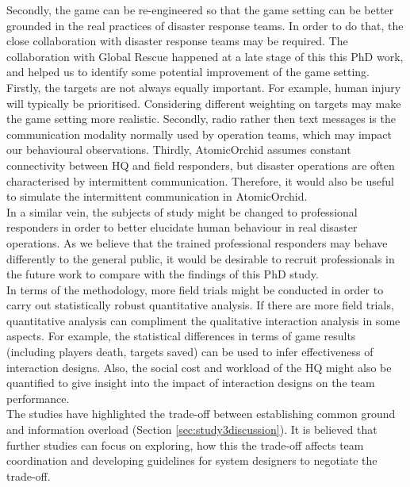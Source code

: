 Secondly, the game can be re-engineered so that the game setting can be better grounded in the real practices of disaster response teams. In order to do that, the close collaboration with disaster response teams may be required. The collaboration with Global Rescue happened at a late stage of this this PhD work, and helped us to identify some potential improvement of the game setting. Firstly, the targets are not always equally important. For example, human injury will typically be prioritised. Considering different weighting on targets may make the game setting more realistic. Secondly, radio rather then text messages is the communication modality normally used by operation teams, which may impact our behavioural observations. Thirdly, AtomicOrchid assumes constant connectivity between HQ and field responders, but disaster operations are often characterised by intermittent communication. Therefore, it would also be useful to simulate the intermittent communication in AtomicOrchid.  \\

In a similar vein, the subjects of study might be changed to professional responders in order to better elucidate human behaviour in real disaster operations.  As we believe that the trained professional responders may behave differently to the general public, it would be desirable to recruit professionals in the future work to compare with the findings of this PhD study.\\

In terms of the methodology, more field trials might be conducted in order to carry out statistically robust quantitative analysis. If there are more field trials, quantitative analysis can compliment the qualitative interaction analysis in some aspects. For example, the statistical differences in terms of game results (including players death, targets saved) can be used to infer effectiveness of interaction designs. Also, the social cost and workload of the HQ might also be quantified  to give insight into the impact of interaction designs on the team performance. \\ %

The studies have highlighted the trade-off between establishing common ground and information overload (Section \ref{sec:study3discussion}). It is believed that further studies can focus on exploring, how this the trade-off affects team coordination and developing guidelines for system designers to negotiate the trade-off. \\  

